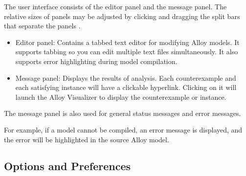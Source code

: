 \documentclass[a4paper,10pt]{report}
\begin{document}
The user interface consists of the editor panel and the message panel. The relative sizes of panels may be adjusted by clicking and dragging the split bars that separate the panels \cite{DanielJackson}.
\begin{itemize}
\item 	Editor panel: Contains a tabbed text editor for modifying Alloy models. It supports tabbing so you can edit multiple text files simultaneously. It also supports error highlighting during model compilation.
\item 	Message panel: Displays the results of analysis. Each counterexample and each satisfying instance will have a clickable hyperlink. Clicking on it will launch the Alloy Visualizer to display the counterexample or instance.
\end{itemize}
The message panel is also used for general status messages and error messages.

For example, if a model cannot be compiled, an error message is displayed, and the error will be highlighted in the source Alloy model.

\subsection{Options and Preferences}
\label{Options & Preference}
\end{document}
